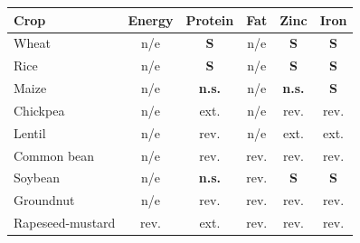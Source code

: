 \begin{tabular}{@{}lccccc@{}}
\toprule
Crop & Energy & Protein & Fat & Zinc & Iron \\
\midrule
Wheat & n/e & \textbf{S} & n/e & \textbf{S} & \textbf{S} \\
Rice & n/e & \textbf{S} & n/e & \textbf{S} & \textbf{S} \\
Maize & n/e & \textbf{n.s.} & n/e & \textbf{n.s.} & \textbf{S} \\
Chickpea & n/e & ext. & n/e & rev. & rev. \\
Lentil & n/e & rev. & n/e & ext. & ext. \\
Common bean & n/e & rev. & rev. & rev. & rev. \\
Soybean & n/e & \textbf{n.s.} & rev. & \textbf{S} & \textbf{S} \\
Groundnut & n/e & rev. & rev. & rev. & rev. \\
Rapeseed-mustard & rev. & ext. & rev. & rev. & rev. \\
\bottomrule
\end{tabular}

